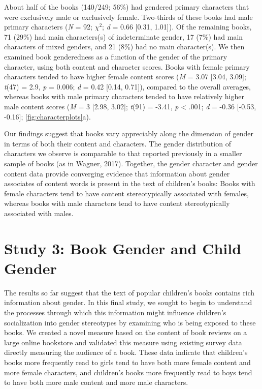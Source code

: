 \documentclass[english,,man,floatsintext]{apa6}
\begin{document}
About half of the books (140/249; 56\%) had gendered primary characters that were exclusively male or exclusively female. Two-thirds of these books had male primary characters (\emph{N} = 92; \(\chi^2\); \emph{d} = 0.66 {[}0.31, 1.01{]}). Of the remaining books, 71 (29\%) had main characters(s) of indeterminate gender, 17 (7\%) had main characters of mixed genders, and 21 (8\%) had no main character(s). We then examined book genderedness as a function of the gender of the primary character, using both content and character scores. Books with female primary characters tended to have higher female content scores (\emph{M} = 3.07 {[}3.04, 3.09{]}; \emph{t}(47) = 2.9, \emph{p} = 0.006; \emph{d} = 0.42 {[}0.14, 0.71{]}), compared to the overall averages, whereas books with male primary characters tended to have relatively higher male content scores (\emph{M} = 3 {[}2.98, 3.02{]}; \emph{t}(91) = -3.41, \emph{p} \textless{} .001; \emph{d} = -0.36 {[}-0.53, -0.16{]}; \autoref{fig:characterplots}a).

Our findings suggest that books vary appreciably along the dimension of gender in terms of both their content and characters. The gender distribution of characters we observe is comparable to that reported previously in a smaller sample of books (as in Wagner, 2017). Together, the gender character and gender content data provide converging evidence that information about gender associates of content words is present in the text of children's books: Books with female characters tend to have content stereotypically associated with females, whereas books with male characters tend to have content stereotypically associated with males.

\hypertarget{study-3-book-gender-and-child-gender}{%
\section{Study 3: Book Gender and Child Gender}\label{study-3-book-gender-and-child-gender}}

The results so far suggest that the text of popular children's books contains rich information about gender. In this final study, we sought to begin to understand the processes through which this information might influence children's socialization into gender stereotypes by examining who is being exposed to these books. We created a novel measure based on the content of book reviews on a large online bookstore and validated this measure using existing survey data directly measuring the audience of a book. These data indicate that children's books more frequently read to girls tend to have both more female content and more female characters, and children's books more frequently read to boys tend to have both more male content and more male characters.
\end{document}
